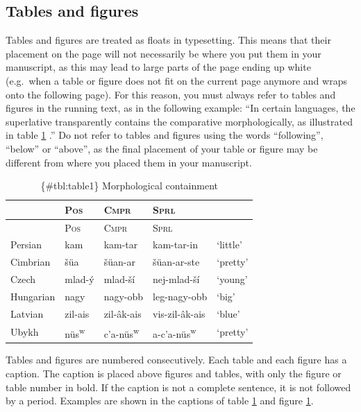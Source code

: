 \documentclass[]{glossa}
\begin{document}
\hypertarget{tables-and-figures}{%
\subsection{Tables and figures}\label{tables-and-figures}}

Tables and figures are treated as floats in typesetting. This means that
their placement on the page will not necessarily be where you put them
in your manuscript, as this may lead to large parts of the page ending
up white (e.g.~when a table or figure does not fit on the current page
anymore and wraps onto the following page). For this reason, you must
always refer to tables and figures in the running text, as in the
following example: ``In certain languages, the superlative transparently
contains the comparative morphologically, as illustrated in table
\protect\hyperlink{tbl:table1}{1} \citep[ 46]{Bobaljik2012}.'' Do not
refer to tables and figures using the words ``following'', ``below'' or
``above'', as the final placement of your table or figure may be
different from where you placed them in your manuscript.

\begin{longtable}[]{@{}lllll@{}}
\caption{\{\#tbl:table1\} Morphological containment}\tabularnewline
\toprule\noalign{}
& \textsc{Pos} & \textsc{Cmpr} & \textsc{Sprl} & \\
\midrule\noalign{}
\endfirsthead
\toprule\noalign{}
& \textsc{Pos} & \textsc{Cmpr} & \textsc{Sprl} & \\
\midrule\noalign{}
\endhead
\bottomrule\noalign{}
\endlastfoot
Persian & kam & kam-tar & kam-tar-in & `little' \\
Cimbrian & šüa & šüan-ar & šüan-ar-ste & `pretty' \\
Czech & mlad-ý & mlad-ší & nej-mlad-ší & `young' \\
Hungarian & nagy & nagy-obb & leg-nagy-obb & `big' \\
Latvian & zil-ais & zil-âk-ais & vis-zil-âk-ais & `blue' \\
Ubykh & nüs\textsuperscript{w} & c'a-nüs\textsuperscript{w} &
a-c'a-nüs\textsuperscript{w} & `pretty' \\
\end{longtable}

Tables and figures are numbered consecutively. Each table and each
figure has a caption. The caption is placed above figures and tables,
with only the figure or table number in bold. If the caption is not a
complete sentence, it is not followed by a period. Examples are shown in
the captions of table \protect\hyperlink{tbl:table1}{1} and figure
\protect\hyperlink{fig:glossalogo}{1}.
\end{document}
